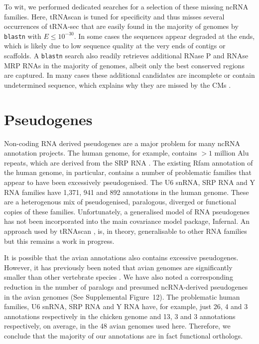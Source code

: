 \documentclass[10pt]{bmc_article}
\newenvironment{bmcformat}{\begin{raggedright}\baselineskip20pt\sloppy\setboolean{publ}{false}}{\end{raggedright}\baselineskip20pt\sloppy}
\begin{document}
\begin{bmcformat}
To wit, we performed dedicated searches for a selection of these
missing ncRNA families. Here, tRNAscan is tuned for specificity and
thus misses several occurrences of tRNA-sec that are easily found in
the majority of genomes by \texttt{blastn} with $E\le 10^{-30}$. In some cases the
sequences appear degraded at the ends, which is likely due to low
sequence quality at the very ends of contigs or scaffolds. A \texttt{blastn}
search also readily retrieves additional RNase P and RNAse MRP RNAs in
the majority of genomes, albeit only the best conserved regions are
captured. In many cases these additional candidates are incomplete or
contain undetermined sequence, which explains why they are missed by
the CMs \cite{Stadler:09b,Kolbe:2009}.



\section*{Pseudogenes}


Non-coding RNA derived pseudogenes are a major problem for many ncRNA
annotation projects. The human genome, for example, contains $>1$
million Alu repeats, which are derived from the SRP RNA
\cite{Wheeler:2013}. The existing Rfam annotation of the human genome,
in particular, contains a number of problematic families that appear
to have been excessively pseudogenised. The U6 snRNA, SRP RNA and Y
RNA families have 1,371, 941 and 892 annotations in the human
genome. These are a heterogenous mix of pseudogenised, paralogous,
diverged or functional copies of these families. Unfortunately, a
generalised model of RNA pseudogenes has not been incorporated into
the main covariance model package, Infernal. An approach used by tRNAscan
\cite{Lowe:1997}, is, in theory, generalisable to other RNA families
but this remains a work in progress. 

It is possible that the avian annotations also contains excessive
pseudogenes. However, it has previously been noted that avian genomes
are significantly smaller than other vertebrate species
\cite{International_Chicken_Genome_Sequencing_Consortium:2004}. We
have also noted a corresponding reduction in the number of paralogs
and presumed ncRNA-derived pseudogenes in the avian genomes (See
Supplemental Figure~12). The problematic human families, U6 snRNA, SRP
RNA and Y RNA have, for example, just 26, 4 and 3 annotations
respectively in the chicken genome and 13, 3 and 3 annotations
respectively, on average, in the 48 avian genomes used here.
Therefore, we conclude that the majority of our annotations are in fact
functional orthologs.


\end{bmcformat}
\end{document}
